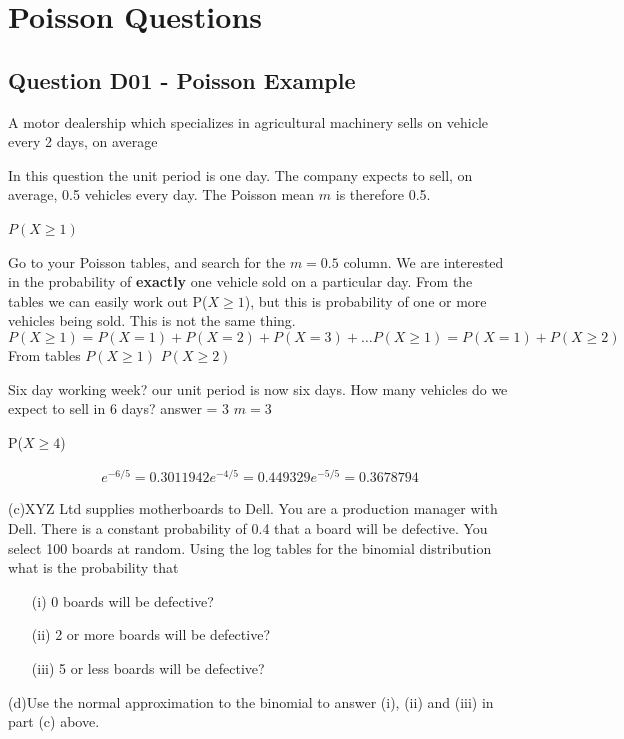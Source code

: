 \documentclass[]{report}
\begin{document}
{\section{Poisson Questions}








\subsection{Question D01  - Poisson Example}
A motor dealership which specializes in agricultural machinery sells on vehicle every 2 days, on average

In this question the unit period is one day. The company expects to sell, on average, 0.5 vehicles every day.
The Poisson mean $m$ is therefore 0.5.

$P(X \geq 1)$

Go to your Poisson tables, and search for the $m=0.5$ column.
We are interested in the probability of \textbf{exactly} one vehicle sold on a particular day.
From the tables we can easily work out P($X \geq 1$), but this is probability of one or more vehicles being sold.
This is not the same thing.
\[P(X \geq 1) = P(X =1) + P( X=2) + P(X=3) + \ldots
P(X \geq 1) = P(X=1) + P(X \geq 2)\]
From tables
$P(X \geq 1)$
$P(X \geq 2)$

Six day working week?
our unit period is now six days.
How many vehicles do we expect to sell in 6 days?
answer = 3
$m=3$

P($X\geq 4$)

\begin{eqnarray}
e^{-6/5} = 0.3011942
e^{-4/5} = 0.449329
e^{-5/5} = 0.3678794
\end{eqnarray}










(c)XYZ Ltd supplies motherboards to Dell.  You are a production manager with Dell.  There is a constant probability of 0.4 that a board will be defective.  You select 100 boards at random.  Using the log tables for the binomial distribution what is the probability that

\begin{itemize}
\item[(i)] 0 boards will be defective?
\item[(ii)] 2 or more boards will be defective?
\item[(iii)]5 or less boards will be defective?
\end{itemize}
(d)Use the normal approximation to the binomial to answer (i), (ii) and (iii) in part (c) above.

}
\end{document}
